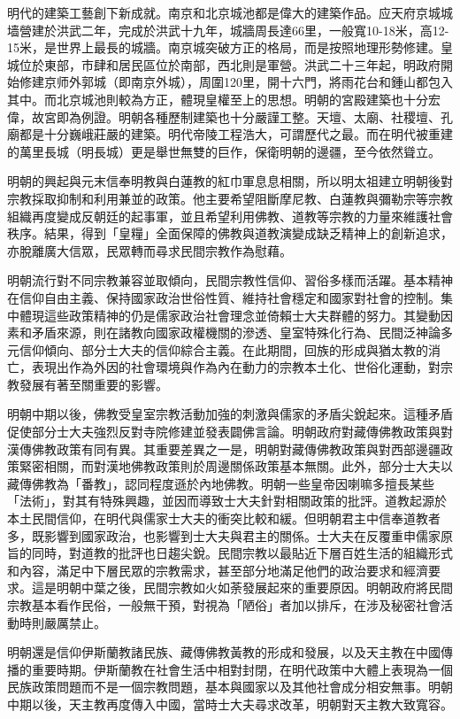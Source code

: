 明代的建築工藝創下新成就。南京和北京城池都是偉大的建築作品。应天府京城城墙營建於洪武二年，完成於洪武十九年，城牆周長達66里，一般寬10-18米，高12-15米，是世界上最長的城牆。南京城突破方正的格局，而是按照地理形勢修建。皇城位於東部，市肆和居民區位於南部，西北則是軍營。洪武二十三年起，明政府開始修建京师外郭城（即南京外城），周圍120里，開十六門，將雨花台和鍾山都包入其中。而北京城池則較為方正，體現皇權至上的思想。明朝的宮殿建築也十分宏偉，故宮即為例證。明朝各種歷制建築也十分嚴謹工整。天壇、太廟、社稷壇、孔廟都是十分巍峨莊嚴的建築。明代帝陵工程浩大，可謂歷代之最。而在明代被重建的萬里長城（明長城）更是舉世無雙的巨作，保衛明朝的邊疆，至今依然聳立。

明朝的興起與元末信奉明教與白蓮教的紅巾軍息息相關，所以明太祖建立明朝後對宗教採取抑制和利用兼並的政策。他主要希望阻斷摩尼教、白蓮教與彌勒宗等宗教組織再度變成反朝廷的起事軍，並且希望利用佛教、道教等宗教的力量來維護社會秩序。結果，得到「皇糧」全面保障的佛教與道教演變成缺乏精神上的創新追求，亦脫離廣大信眾，民眾轉而尋求民間宗教作為慰藉。

明朝流行對不同宗教兼容並取傾向，民間宗教性信仰、習俗多樣而活躍。基本精神在信仰自由主義、保持國家政治世俗性質、維持社會穩定和國家對社會的控制。集中體現這些政策精神的仍是儒家政治社會理念並倚賴士大夫群體的努力。其變動因素和矛盾來源，則在諸教向國家政權機關的滲透、皇室特殊化行為、民間泛神論多元信仰傾向、部分士大夫的信仰綜合主義。在此期間，回族的形成與猶太教的消亡，表現出作為外因的社會環境與作為內在動力的宗教本土化、世俗化運動，對宗教發展有著至關重要的影響。

明朝中期以後，佛教受皇室宗教活動加強的刺激與儒家的矛盾尖銳起來。這種矛盾促使部分士大夫強烈反對寺院修建並發表闢佛言論。明朝政府對藏傳佛教政策與對漢傳佛教政策有同有異。其重要差異之一是，明朝對藏傳佛教政策與對西部邊疆政策緊密相關，而對漢地佛教政策則於周邊關係政策基本無關。此外，部分士大夫以藏傳佛教為「番教」，認同程度遜於內地佛教。明朝一些皇帝因喇嘛多擅長某些「法術」，對其有特殊興趣，並因而導致士大夫針對相關政策的批評。道教起源於本土民間信仰，在明代與儒家士大夫的衝突比較和緩。但明朝君主中信奉道教者多，既影響到國家政治，也影響到士大夫與君主的關係。士大夫在反覆重申儒家原旨的同時，對道教的批評也日趨尖銳。民間宗教以最貼近下層百姓生活的組織形式和內容，滿足中下層民眾的宗教需求，甚至部分地滿足他們的政治要求和經濟要求。這是明朝中葉之後，民間宗教如火如荼發展起來的重要原因。明朝政府將民間宗教基本看作民俗，一般無干預，對視為「陋俗」者加以排斥，在涉及秘密社會活動時則嚴厲禁止。

明朝還是信仰伊斯蘭教諸民族、藏傳佛教黃教的形成和發展，以及天主教在中國傳播的重要時期。伊斯蘭教在社會生活中相對封閉，在明代政策中大體上表現為一個民族政策問題而不是一個宗教問題，基本與國家以及其他社會成分相安無事。明朝中期以後，天主教再度傳入中國，當時士大夫尋求改革，明朝對天主教大致寬容。


